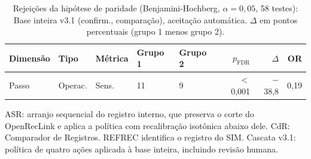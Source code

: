 \begin{table}[htbp]
\centering
\caption{Rejei\c{c}\~oes da hip\'otese de paridade (Benjamini-Hochberg, $\alpha = 0{,}05$, 58 testes): Base inteira v3.1 (confirm., comparação), aceitação automática. $\Delta$ em pontos percentuais (grupo 1 menos grupo 2).}
\label{tab:equidade-arranjo-rejeicoes-cascata-v31-confirmacao}
\footnotesize\setlength{\tabcolsep}{3pt}
\begin{tabular}{lllllrrr}
\toprule
Dimens\~ao & Tipo & M\'etrica & Grupo 1 & Grupo 2 & $p_{\mathrm{FDR}}$ & $\Delta$ & OR \\
\midrule
Passo & Operac. & Sens. & 11 & 9 & $<$0{,}001 & $-$38{,}8 & 0{,}19 \\
\bottomrule
\end{tabular}
\par{}\par\footnotesize ASR: arranjo sequencial do registro interno, que preserva o corte do OpenRecLink e aplica a política com recalibração isotônica abaixo dele. CdR: Comparador de Registros. REFREC identifica o registro do SIM. Cascata v3.1: política de quatro ações aplicada à base inteira, incluindo revisão humana.
\end{table}
